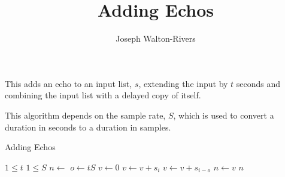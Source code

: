 \documentclass{../fal_assignment}
\title{Adding Echos}
\author{Joseph Walton-Rivers}
\begin{document}
\maketitle

This adds an echo to an input list, $s$, extending the input by $t$ seconds and combining the input list with a delayed copy of itself.

This algorithm depends on the sample rate, $S$, which is used to convert a duration in seconds to a duration in samples.

\begin{algorithm}[ht]
	\caption{Adding Echos}
	\label{alg:algorithm}
	
	\begin{algorithmic}[1]
		\Require
		\Statex $1 \le t$
		\Statex $1 \le S$ 
		\Ensure
		\State $n\gets$ 
		\State $o \gets tS$
		\State $v \gets 0$
		\State $v \gets v + s_i$
		\EndIf
		\State $v \gets v + s_{i - o}$
		\EndIf
		\State $n \gets v$
		\EndFor
		\State \Return $n$
		\EndFunction
	\end{algorithmic}
\end{algorithm}
\end{document}
